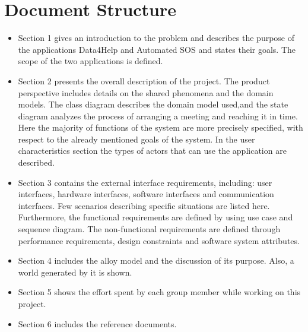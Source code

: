 \section{Document Structure} %
\begin{itemize}
    \item Section 1 gives an introduction to the problem and describes the purpose of the applications Data4Help and Automated SOS and states their goals. The scope of the two applications is defined.
    \item Section 2 presents the overall description of the project. The product perspective includes details on the shared phenomena and the domain models. The class diagram describes the domain model used,and the state diagram analyzes the process of arranging a meeting and reaching it in time. Here the majority of functions of the system are more precisely specified, with respect to the already mentioned goals of the system. In the user characteristics section the types of actors that can use the application are described.
    \item Section 3 contains the external interface requirements, including: user interfaces, hardware interfaces, software interfaces and communication interfaces. Few scenarios describing specific situations are listed here. Furthermore, the functional requirements are defined by using use case and sequence diagram.
    The non-functional requirements are defined through performance requirements, design constraints and software system attributes.
    \item Section 4 includes the alloy model and the discussion of its purpose. Also, a world generated by it is shown.
    \item Section 5 shows the effort spent by each group member while working on this project.
    \item Section 6 includes the reference documents.
\end{itemize}
